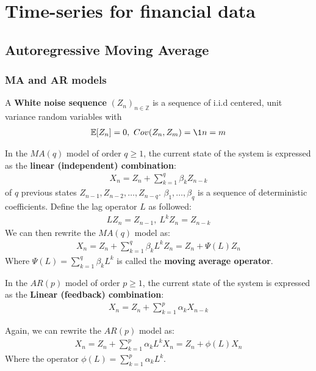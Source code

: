\newpage
\section{Time-series for financial data}
\subsection{Autoregressive Moving Average}
\subsubsection{\textbf{MA} and \textbf{AR} models}
\begin{definition}
    A \textbf{White noise sequence} $(Z_n)_{n\in\mathbb{Z}}$ is a sequence of i.i.d centered, unit variance random variables with
    \begin{align*}
        \mathbb{E}[Z_n] = 0, \ Cov(Z_n, Z_m) = \1{n=m}
    \end{align*}
\end{definition}

\begin{definition}
    In the $MA(q)$ model of order $q\ge 1$, the current state of the system is expressed as the \textbf{linear (independent) combination}:
    \begin{align*}
        \boxed{
            X_n = Z_n + \sum_{k=1}^q \beta_k Z_{n-k}
        }
    \end{align*}
    \noindent of $q$ previous states $Z_{n-1}, Z_{n-2}, \dots, Z_{n-q}$. $\beta_1, \dots, \beta_q$ is a sequence of deterministic coefficients. Define the lag operator $L$ as followed:
    \begin{align*}
        LZ_n = Z_{n-1}, \ L^kZ_n = Z_{n-k}
    \end{align*}
    \noindent We can then rewrite the $MA(q)$ model as:
    \begin{align*}
        \boxed{
            X_n = Z_n + \sum_{k=1}^q\beta_kL^kZ_n = Z_n + \Psi(L)Z_n
        }   
    \end{align*}
    \noindent Where $\Psi(L) = \sum_{k=1}^q \beta_kL^k$ is called the \textbf{moving average operator}.
\end{definition}

\begin{definition}
    In the $AR(p)$ model of order $p\ge 1$, the current state of the system is expressed as the \textbf{Linear (feedback) combination}:
    \begin{align*}
        \boxed{
            X_n = Z_n + \sum_{k=1}^p \alpha_k X_{n-k}
        }
    \end{align*}

    \noindent Again, we can rewrite the $AR(p)$ model as:
    \begin{align*}
        \boxed{
            X_n = Z_n + \sum_{k=1}^p \alpha_kL^kX_n = Z_n + \phi(L)X_n
        }
    \end{align*}
    \noindent Where the operator $\phi(L) = \sum_{k=1}^p \alpha_kL^k$.
\end{definition}

